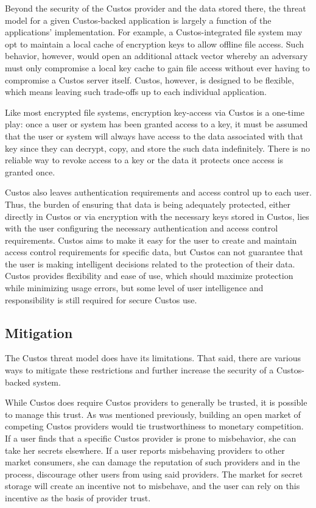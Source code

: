 Beyond the security of the Custos provider and the data stored there,
the threat model for a given Custos-backed application is largely a
function of the applications' implementation. For example, a
Custos-integrated file system may opt to maintain a local cache of
encryption keys to allow offline file access. Such behavior, however,
would open an additional attack vector whereby an adversary must only
compromise a local key cache to gain file access without ever having
to compromise a Custos server itself. Custos, however, is designed to
be flexible, which means leaving such trade-offs up to each individual
application.

Like most encrypted file systems, encryption key-access via Custos is
a one-time play: once a user or system has been granted access to a
key, it must be assumed that the user or system will always have
access to the data associated with that key since they can decrypt,
copy, and store the such data indefinitely. There is no reliable way
to revoke access to a key or the data it protects once access is
granted once.

Custos also leaves authentication requirements and access control up
to each user. Thus, the burden of ensuring that data is being
adequately protected, either directly in Custos or via encryption with
the necessary keys stored in Custos, lies with the user configuring
the necessary authentication and access control requirements. Custos
aims to make it easy for the user to create and maintain access
control requirements for specific data, but Custos can not guarantee
that the user is making intelligent decisions related to the
protection of their data. Custos provides flexibility and ease of use,
which should maximize protection while minimizing usage errors, but
some level of user intelligence and responsibility is still required
for secure Custos use.

\subsection{Mitigation}

The Custos threat model does have its limitations. That said, there
are various ways to mitigate these restrictions and further increase
the security of a Custos-backed system.

While Custos does require Custos providers to generally be trusted, it
is possible to manage this trust. As was mentioned previously,
building an open market of competing Custos providers would tie
trustworthiness to monetary competition. If a user finds that a
specific Custos provider is prone to misbehavior, she can take her
secrets elsewhere. If a user reports misbehaving providers to other
market consumers, she can damage the reputation of such providers and
in the process, discourage other users from using said providers. The
market for secret storage will create an incentive not to misbehave,
and the user can rely on this incentive as the basis of provider
trust.

